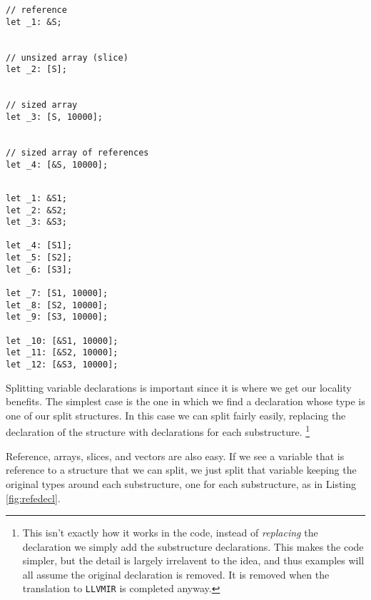 \documentclass[prodmode,acmtecs]{acmsmall} %
\newcommand{\rustname}{{\texttt{Rust}}}
\def \rust {\rustname{}\xspace}
\newcommand{\llvmirname}{{\texttt{LLVMIR}}}
\def \llvmir {\llvmirname{}\xspace}
\begin{document}
\label{sec:splitting}
\begin{figure*}
  \begin{minipage}[t]{0.5\linewidth}
    \begin{verbatim}
// reference
let _1: &S;


// unsized array (slice)
let _2: [S];


// sized array
let _3: [S, 10000];


// sized array of references
let _4: [&S, 10000];


\end{verbatim}
\end{minipage}
\begin{minipage}[t]{0.5\linewidth}
\begin{verbatim}
let _1: &S1;
let _2: &S2;
let _3: &S3;

let _4: [S1];
let _5: [S2];
let _6: [S3];

let _7: [S1, 10000];
let _8: [S2, 10000];
let _9: [S3, 10000];

let _10: [&S1, 10000];
let _11: [&S2, 10000];
let _12: [&S3, 10000];
\end{verbatim}
\end{minipage}


  \caption{Reference and Array Splitting $g = 3$}
  \label{fig:refedecl}
\end{figure*}
Splitting variable declarations is important since it is where
we get our locality benefits.  The simplest case is the one in which
we find a declaration whose type is one of our split structures. In this 
case we can split fairly easily, replacing the declaration of the structure with
declarations for each substructure.  
\footnote{This isn't exactly how it works in the code, instead of 
  \textit{replacing} the declaration we simply add the 
  substructure declarations.  This makes the code simpler, 
  but the detail is largely irrelavent to the
  idea, and thus examples will all assume the original declaration is removed.
  It is removed when the translation to \llvmir is completed anyway.}

Reference, arrays, slices, and vectors are also easy. 
If we see a variable that is reference to a structure 
that we can split, we just split that variable keeping the original
types around each substructure, 
one for each substructure, as in Listing \ref{fig:refedecl}.


\end{document}
